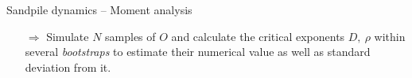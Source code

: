 \documentclass[xcolor=dvipsnames]{beamer}
\newcommand{\myitemsep}{\setlength\itemsep{0.33cm}}
\begin{document}
	\begin{frame}{Sandpile dynamics -- Moment analysis}
		\begin{itemize}
			\myitemsep
			\item[$\Rightarrow$] Simulate $N$ samples of $O$ and calculate the critical exponents $D,\ \rho$ within several \textit{bootstraps} to estimate their numerical value as well as standard deviation from it.
		\end{itemize}
	\end{frame}
		
\end{document}
